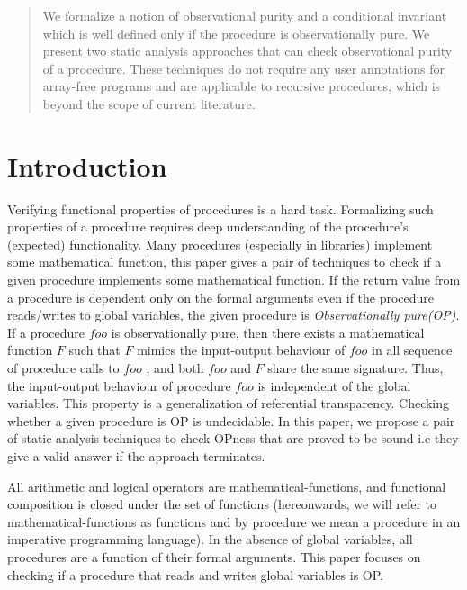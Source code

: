 \documentclass{llncs}
\newcommand{\foo}{\textit{foo}}
\newcommand{\F}{\mathit{F}}
\begin{document}
\begin{abstract}
We formalize a notion of observational purity and a conditional
invariant which is well defined only if the procedure is
observationally pure.  We present two static analysis approaches that
can check observational purity of a procedure. These techniques do not
require any user annotations for array-free programs and are
applicable to recursive procedures, which is beyond the scope of
current literature.

\end{abstract}

\section{Introduction}
Verifying functional properties of procedures is a hard task.
Formalizing such properties of a procedure requires deep understanding
of the procedure's (expected) functionality. Many procedures
(especially in libraries) implement some mathematical function, this
paper gives a pair of techniques to check if a given procedure
implements some mathematical function. If the return value from a
procedure is dependent only on the formal arguments even if the
procedure reads/writes to global variables, the given procedure is
\textit{Observationally pure(OP)}.  If a procedure $\foo$ is
observationally pure, then there exists a mathematical function $\F$
such that $\F$ mimics the input-output behaviour of $\foo$ in all
sequence of procedure calls to $\foo$ , and both $\foo$ and $\F$ share
the same signature.  Thus, the input-output behaviour of procedure
$\foo$ is independent of the global variables. This property is a
generalization of referential transparency.
Checking whether a given procedure is OP is undecidable. In this
paper, we propose a pair of static analysis techniques to check OPness
that are proved to be sound i.e they give a valid answer if the
approach terminates.

All arithmetic and logical operators are mathematical-functions, and
functional composition is closed under the set of functions
(hereonwards, we will refer to mathematical-functions as functions and
by procedure we mean a procedure in an imperative programming
language).  In the absence of global variables, all procedures are a
function of their formal arguments. This paper focuses on checking if
a procedure that reads and writes global variables is OP.
\end{document}
